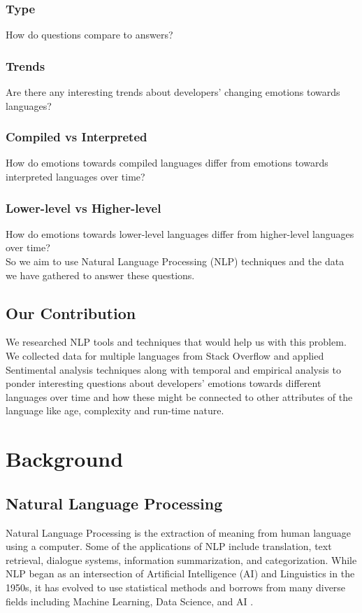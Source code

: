 \documentclass[conference]{IEEEtran}
\begin{document}
 \subsubsection{Type}How do questions compare to answers?
 \subsubsection{Trends}Are there any interesting trends about developers' changing emotions towards languages?
 \subsubsection{Compiled vs Interpreted}How do emotions towards compiled languages differ from emotions towards interpreted languages over time?
 \subsubsection{Lower-level vs Higher-level} How do emotions towards lower-level languages differ from higher-level languages over time?\\
 

So we aim to use Natural Language Processing (NLP) techniques and the data we have gathered to answer these questions.

\subsection{Our Contribution}
We researched NLP tools and techniques that would help us with this problem. We collected data for multiple languages from Stack Overflow and applied Sentimental analysis techniques along with temporal and empirical analysis to ponder interesting questions about developers' emotions towards different languages over time and how these might be connected to other attributes of the language like age, complexity and run-time nature.\\

\section{Background}

\subsection{Natural Language Processing}
Natural Language Processing is the extraction of meaning from human language using a computer\cite{b7, b8}. Some of the applications of NLP include translation, text retrieval, dialogue systems, information summarization, and categorization\cite{b7}. While NLP began as an intersection of Artificial Intelligence (AI) and Linguistics in the 1950s, it has evolved to use statistical methods and borrows from many diverse fields including Machine Learning, Data Science, and AI \cite{b8}. \\
\end{document}
